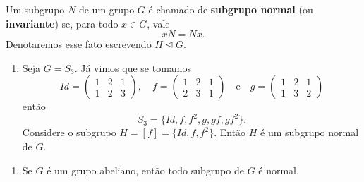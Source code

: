 \documentclass{beamer}
\begin{document}
    \begin{frame}
        \begin{definicao}
            Um subgrupo $N$ de um grupo $G$ é chamado de \textbf{subgrupo normal} (ou \textbf{invariante}) se, para todo $x \in G$, vale
            \[
                xN = Nx.
            \]
            Denotaremos esse fato escrevendo $H \unlhd G$.
        \end{definicao}
    \end{frame}

    \begin{frame}
        \begin{exemplos}
            \begin{enumerate}[label=({\arabic*})]
                \item Seja $G = S_3$. Já vimos que se tomamos
                \[
                    Id = \begin{pmatrix}
                        1 & 2 & 1\\
                        1 & 2 & 3
                    \end{pmatrix},\quad
                    f = \begin{pmatrix}
                        1 & 2 & 1\\
                        2 & 3 & 1
                    \end{pmatrix} \quad \mbox{e}\quad
                    g = \begin{pmatrix}
                        1 & 2 & 1\\
                        1 & 3 & 2
                    \end{pmatrix}
                \]
                então
                \[
                    S_3 = \{Id, f, f^2, g, gf, gf^2\}.
                \]
                Considere o subgrupo $H = [f] = \{Id, f, f^2\}$. Então $H$ é um subgrupo normal de $G$.

                \seti
            \end{enumerate}
        \end{exemplos}
    \end{frame}

    \begin{frame}
        \begin{exemplos}
            \begin{enumerate}[label=({\arabic*})]
                \seti

                \item Se $G$ é um grupo abeliano, então todo subgrupo de $G$ é normal.
                
                \conti
            \end{enumerate}
        \end{exemplos}
    \end{frame}
\end{document}
